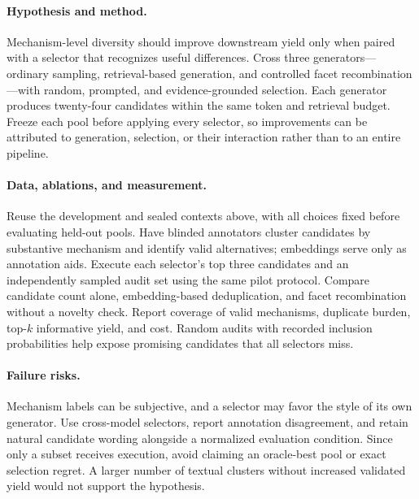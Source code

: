 \paragraph{Hypothesis and method.}
Mechanism-level diversity should improve downstream yield only when paired with a selector that recognizes useful differences. Cross three generators---ordinary sampling, retrieval-based generation, and controlled facet recombination---with random, prompted, and evidence-grounded selection. Each generator produces twenty-four candidates within the same token and retrieval budget. Freeze each pool before applying every selector, so improvements can be attributed to generation, selection, or their interaction rather than to an entire pipeline.

\paragraph{Data, ablations, and measurement.}
Reuse the development and sealed contexts above, with all choices fixed before evaluating held-out pools. Have blinded annotators cluster candidates by substantive mechanism and identify valid alternatives; embeddings serve only as annotation aids. Execute each selector's top three candidates and an independently sampled audit set using the same pilot protocol. Compare candidate count alone, embedding-based deduplication, and facet recombination without a novelty check. Report coverage of valid mechanisms, duplicate burden, top-$k$ informative yield, and cost. Random audits with recorded inclusion probabilities help expose promising candidates that all selectors miss.

\paragraph{Failure risks.}
Mechanism labels can be subjective, and a selector may favor the style of its own generator. Use cross-model selectors, report annotation disagreement, and retain natural candidate wording alongside a normalized evaluation condition. Since only a subset receives execution, avoid claiming an oracle-best pool or exact selection regret. A larger number of textual clusters without increased validated yield would not support the hypothesis.
